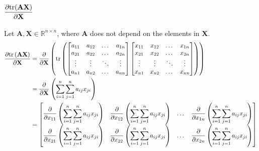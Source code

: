 \documentclass{article}
\newcommand{\tr}[1]{\ensuremath{\textnormal{tr}\left(#1\right)}} %
\begin{document}
\subsection{\(\dfrac{\partial \textnormal{tr}(\mathbf{AX})}{\partial \mathbf{X}}\)}

Let \(\mathbf{A}, \mathbf{X} \in \mathbb{R}^{n\times n}\), where \(\mathbf{A}\) does not depend on the elements in \(\mathbf{X}\).
\begin{align*}
    \frac{\partial \textnormal{tr}\left(\mathbf{A} \mathbf{X}\right)}{\partial \mathbf{X}} &= \frac{\partial}{\partial \mathbf{X}} \left( \tr{\begin{bmatrix}
        a_{11} & a_{12} & \dots & a_{1n} \\
        a_{21} & a_{22} & \dots & a_{2n} \\
        \vdots & \vdots & \ddots & \vdots \\
        a_{n1} & a_{n2} & \dots & a_{nn} \\
    \end{bmatrix}
    \begin{bmatrix}
        x_{11} & x_{12} & \dots & x_{1n} \\
        x_{21} & x_{22} & \dots & x_{2n} \\
        \vdots & \vdots & \ddots & \vdots \\
        x_{n1} & x_{n2} & \dots & x_{nn} \\
    \end{bmatrix} \right)} \\
    &= \frac{\partial}{\partial \mathbf{X}} \left( \sum_{i = 1}^{n} \sum_{j = 1}^{n} a_{ij}x_{ji} \right) \\
    &= \begin{bmatrix}
        \displaystyle \frac{\partial}{\partial x_{11}} \left( \sum_{i = 1}^{n} \sum_{j = 1}^{n} a_{ij}x_{ji} \right) & 
        \displaystyle \frac{\partial}{\partial x_{12}} \left( \sum_{i = 1}^{n} \sum_{j = 1}^{n} a_{ij}x_{ji} \right) & 
        \dots & 
        \displaystyle \frac{\partial}{\partial x_{1n}} \left( \sum_{i = 1}^{n} \sum_{j = 1}^{n} a_{ij}x_{ji} \right) \\
        \displaystyle \frac{\partial}{\partial x_{21}} \left( \sum_{i = 1}^{n} \sum_{j = 1}^{n} a_{ij}x_{ji} \right) & 
        \displaystyle \frac{\partial}{\partial x_{22}} \left( \sum_{i = 1}^{n} \sum_{j = 1}^{n} a_{ij}x_{ji} \right) & 
        \dots & 
        \displaystyle \frac{\partial}{\partial x_{2n}} \left( \sum_{i = 1}^{n} \sum_{j = 1}^{n} a_{ij}x_{ji} \right) \\

\end{bmatrix}
\end{align*}
\end{document}
